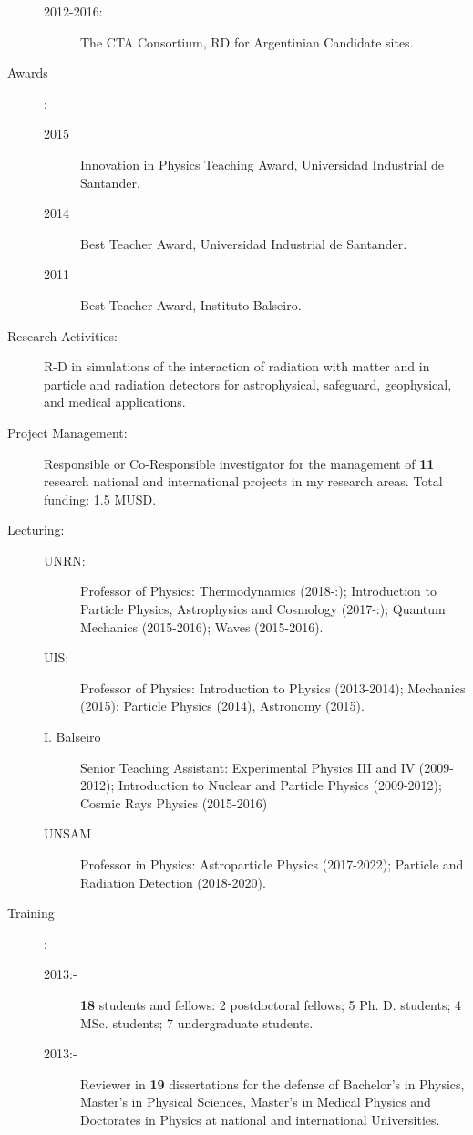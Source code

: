 \documentclass[11pt,a4paper]{article}
\begin{document}
\begin{description}
\begin{description}
        \item[2012-2016:] The CTA Consortium, RD for Argentinian Candidate sites.
    \end{description}
    \item [Awards]:
    \begin{description}
        \item[2015] Innovation in Physics Teaching Award, Universidad Industrial de Santander.
        \item[2014] Best Teacher Award, Universidad Industrial de Santander.
        \item[2011] Best Teacher Award, Instituto Balseiro.
    \end{description}
    \item[Research Activities:] R-D in simulations of the interaction of radiation with matter and in particle and radiation detectors for astrophysical, safeguard, geophysical, and medical applications.
    \item[Project Management:] Responsible or Co-Responsible investigator for the management of {\textbf{11}} research national and international projects in my research areas. Total funding: 1.5 MUSD.
    \item[Lecturing:]
    \begin{description}
        \item [UNRN:] Professor of Physics: Thermodynamics (2018-:); Introduction to Particle Physics, Astrophysics and Cosmology (2017-:); Quantum Mechanics (2015-2016); Waves (2015-2016).
        \item [UIS:] Professor of Physics: Introduction to Physics (2013-2014); Mechanics (2015); Particle Physics (2014), Astronomy (2015).
        \item [I. Balseiro] Senior Teaching Assistant: Experimental Physics III and IV (2009-2012); Introduction to Nuclear and Particle Physics (2009-2012); Cosmic Rays Physics (2015-2016)
        \item [UNSAM] Professor in Physics: Astroparticle Physics (2017-2022); Particle and Radiation Detection (2018-2020).
    \end{description}
    \item[Training]:
    \begin{description}
        \item [2013:-~~~~~~~] {\textbf{18}} students and fellows: 2 postdoctoral fellows; 5 Ph. D. students; 4 MSc. students; 7 undergraduate students.
        \item[2013:-~~~~~~~] Reviewer in {\textbf{19}} dissertations for the defense of Bachelor's in Physics, Master's in Physical Sciences, Master's in Medical Physics and Doctorates in Physics at national and international Universities.

\end{description}
\end{description}
\end{document}
